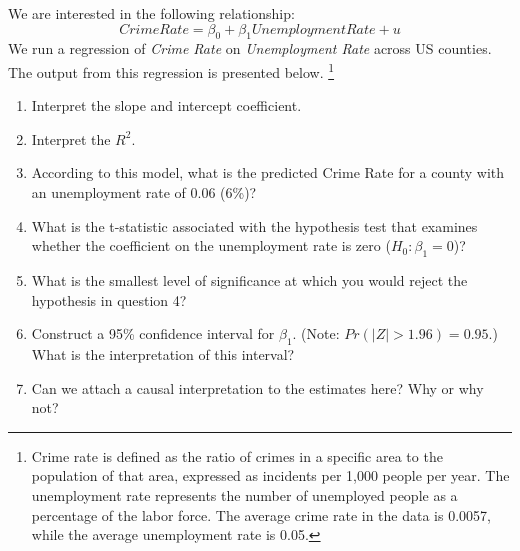 \documentclass{./../../Latex/handout}
\begin{document}
\thispagestyle{plain}
\vspace{-1em}

We are interested in the following relationship:
$$ Crime Rate = \beta_0 + \beta_1 Unemployment Rate + u  $$
We run a regression of \textit{Crime Rate} on \textit{Unemployment Rate} across US counties. The output from this regression is presented below. \footnote{Crime rate is defined as the ratio of crimes in a specific area to the population of that area, expressed as incidents per 1,000 people per year. The unemployment rate represents the number of unemployed people as a percentage of the labor force. The average crime rate in the data is 0.0057, while the average unemployment rate is 0.05.}

\centering
 
\begin{enumerate}
	\item Interpret the slope and intercept coefficient.
	\item Interpret the $R^2$.
	\item According to this model, what is the predicted Crime Rate for a county with an unemployment rate of 0.06 (6\%)? 
	\item What is the t-statistic associated with the hypothesis test that examines whether the coefficient on the unemployment rate is zero ($H_0: \beta_1 = 0$)?
	\item What is the smallest level of significance at which you would reject the hypothesis in question 4? 
	\item Construct a 95\% confidence interval for $\beta_1$. (Note: $Pr(|Z|>1.96)=0.95$.) What is the interpretation of this interval?
	\item Can we attach a causal interpretation to the estimates here? Why or why not?
\end{enumerate}
\end{document}
